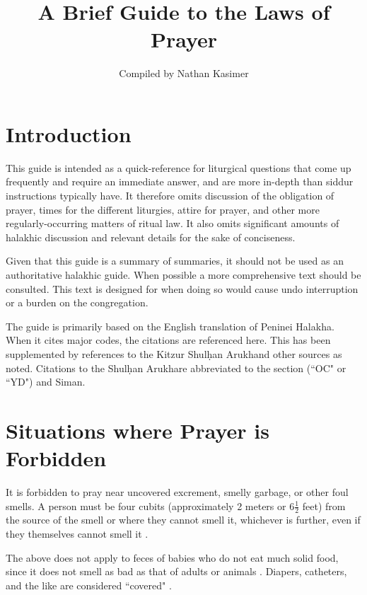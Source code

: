 \documentclass[11pt]{article}
\newcommand{\SA}{Shul\d{h}an Arukh}
\begin{document}
	
\title{A Brief Guide to the Laws of Prayer}

\author{Compiled by Nathan Kasimer}

\date{}

\maketitle


\section{Introduction}

This guide is intended as a quick-reference for liturgical questions that come up frequently and require an immediate answer, and are more in-depth than siddur instructions typically have. It therefore omits discussion of the obligation of prayer, times for the different liturgies, attire for prayer, and other more regularly-occurring matters of ritual law. It also omits significant amounts of halakhic discussion and relevant details for the sake of conciseness.

Given that this guide is a summary of summaries, it should not be used as an authoritative halakhic guide. When possible a more comprehensive text should be consulted.  This text is designed for when doing so would cause undo interruption or a burden on the congregation.

The guide is primarily based on the English translation of Peninei Halakha.  When it cites major codes, the citations are referenced here. This has been supplemented by references to the Kitzur \SA\space and other sources as noted. Citations to the \SA\space are abbreviated to the section  (``OC" or ``YD") and Siman.

\section{Situations where Prayer is Forbidden}

It is forbidden to pray near uncovered excrement, smelly garbage, or other foul smells.  A person must be four cubits (approximately 2 meters or 6$\frac{1}{2}$ feet) from the source of the smell or where they cannot smell it, whichever is further, even if they themselves cannot smell it \parencite*[3:9 citing OC 79]{PH}.%

The above does not apply to feces of babies who do not eat much solid food, since it does not smell as bad as that of adults or animals \parencite*[4:3 citing OC 81]{PH}. Diapers, catheters, and the like are considered ``covered" \parencite*[4:4]{PH}.
\end{document}
